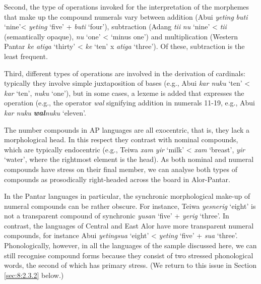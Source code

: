Second, the type of operations invoked for the interpretation of the morphemes that make up the compound numerals vary between addition (Abui \textit{yeting} \textit{buti} `nine'{\textless} \textit{yeting} `five' + \textit{buti} `four'), subtraction (Adang  \textit{ti}\textit{{\textglotstop}}\textit{i} \textit{nu} `nine' {\textless} \textit{ti}\textit{{\textglotstop}}\textit{i} (semantically opaque), \textit{nu} `one' {\textless} `minus one') and multiplication (Western Pantar \textit{ke atiga} `thirty' {\textless} \textit{ke} `ten' x \textit{atiga} `three'). Of these, subtraction is the least frequent.

Third, different types of operations are involved in the derivation of cardinals: typically they involve simple juxtaposition of bases (e.g., Abui \textit{kar nuku} `ten' {\textless} \textit{kar} `ten', \textit{nuku} `one'), but in some cases, a lexeme is added that expresses the operation (e.g., the operator \textit{wal} signifying addition in numerals 11-19, e.g., Abui \textit{kar nuku} \textbf{\textit{wal}}\textit{nuku} `eleven'. 

The number compounds in AP languages are all exocentric, that is, they lack a morphological head. In this respect they contrast with nominal compounds, which are typically endocentric (e.g., Teiwa \textit{xam yir} `milk' {\textless} \textit{xam} `breast', \textit{yir} `water', where the rightmost element is the head). As both nominal and numeral compounds have stress on their final member, we can analyse both types of compounds as prosodically right-headed across the board in Alor-Pantar. 

In the Pantar languages in particular, the synchronic morphological make-up of numeral compounds can be rather obscure. For instance, Teiwa \textit{yesnerig} `eight' is not a transparent compound of synchronic \textit{yusan} `five' + \textit{yerig} `three'. In contrast, the languages of Central and East Alor have more transparent numeral compounds, for instance Abui \textit{yetingsua} `eight' {\textless} \textit{yeting} `five' + \textit{sua} `three'. Phonologically, however, in all the languages of the sample discussed here, we can still recognise compound forms because they consist of two stressed phonological words, the second of which has primary stress. (We return to this issue in Section \ref{sec:8:2.3.2} below.) 

